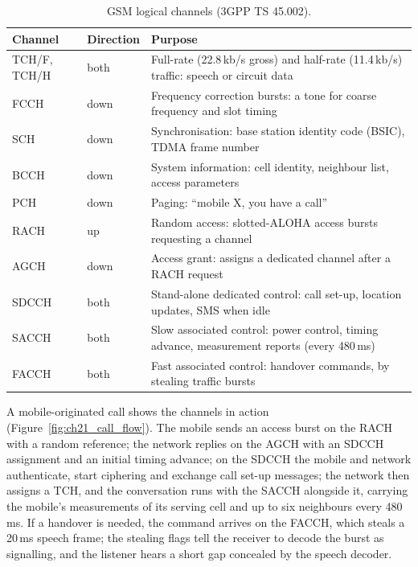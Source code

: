 \begin{table}[htbp]\centering\small
\caption{GSM logical channels (3GPP TS 45.002).}
\label{tab:ch21:gsmlogical}
\begin{tabularx}{\linewidth}{@{}l l X@{}}
\toprule
Channel & Direction & Purpose\\
\midrule
TCH/F, TCH/H & both & Full-rate (22.8\,kb/s gross) and half-rate (11.4\,kb/s) traffic: speech or circuit data\\
FCCH & down & Frequency correction bursts: a tone for coarse frequency and slot timing\\
SCH & down & Synchronisation: base station identity code (BSIC), TDMA frame number\\
BCCH & down & System information: cell identity, neighbour list, access parameters\\
PCH & down & Paging: ``mobile X, you have a call''\\
RACH & up & Random access: slotted-ALOHA access bursts requesting a channel\\
AGCH & down & Access grant: assigns a dedicated channel after a RACH request\\
SDCCH & both & Stand-alone dedicated control: call set-up, location updates, SMS when idle\\
SACCH & both & Slow associated control: power control, timing advance, measurement reports (every 480\,ms)\\
FACCH & both & Fast associated control: handover commands, by stealing traffic bursts\\
\bottomrule
\end{tabularx}
\end{table}

A mobile-originated call shows the channels in action (Figure~\ref{fig:ch21_call_flow}). The mobile
sends an access burst on the RACH with a random reference; the network replies on the AGCH with an
SDCCH assignment and an initial timing advance; on the SDCCH the mobile and network authenticate,
start ciphering and exchange call set-up messages; the network then assigns a TCH, and the
conversation runs with the SACCH alongside it, carrying the mobile's measurements of its serving
cell and up to six neighbours every 480\,ms. If a handover is needed, the command arrives on the
FACCH, which steals a 20\,ms speech frame; the stealing flags tell the receiver to decode the burst
as signalling, and the listener hears a short gap concealed by the speech decoder.


